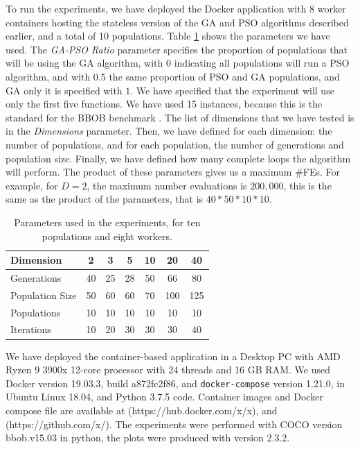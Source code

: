 \documentclass[runningheads]{llncs}
\begin{document}
To run the experiments, we have deployed the Docker application with 8 worker
containers hosting the stateless version of the GA and PSO algorithms described
earlier, and a total of 10 populations. Table \ref{tab:params:10} shows the
parameters we have used. The {\em GA-PSO Ratio} parameter specifies the proportion 
of populations that will be using the GA algorithm, with $0$ indicating all populations
will run a PSO algorithm, and with $0.5$ the same proportion of PSO and GA populations, 
and GA only it is specified with $1$. We have specified that the experiment
will use only the first five functions. We have used 15 instances, because 
this is the standard for the BBOB benchmark \cite{hansen2016coco}.
The list of dimensions that we have tested is in the {\em Dimensions} parameter. 
Then, we have defined for each dimension: the number of populations, and for each population,
the number of generations and population size. Finally, we have defined how many complete loops the
algorithm will perform. The product of these parameters gives us a maximum
\#FEs. For example, for $D = 2$, the maximum number evaluations is $200,000$,
this is the same as the product of the parameters, that is $40*50*10*10$. 

\begin{table}[h!tb]
  \small
  \caption{Parameters used in the experiments, for ten populations and eight workers.
  }
  \label{tab:params:10}
  \vspace{0.25cm}
  \centering
  \small
  \begin{tabular}{|l|c|c|c|c|c|c|}
    \hline
    Dimension        & 2  & 3  & 5  & 10 & 20  & 40  \\ \hline
    Generations      & 40 & 25 & 28 & 50 & 66  & 80  \\ \hline
    Population Size  & 50 & 60 & 60 & 70 & 100 & 125 \\ \hline
    Populations      & 10 & 10 & 10 & 10 & 10  & 10  \\ \hline
    Iterations       & 10 & 20 & 30 & 30 & 30  & 40  \\ \hline  
  \end{tabular}
\end{table}

We have deployed the container-based application in a
Desktop PC with AMD Ryzen 9 3900x 12-core processor with 24 threads 
and 16 GB RAM. We used Docker version 19.03.3, build a872fc2f86, and {\tt docker-compose} version 1.21.0, 
in Ubuntu Linux 18.04, and Python 3.7.5 code. Container images and Docker compose file are available at
(https://hub.docker.com/x/x), and (https://github.com/x/). 
The experiments were performed with COCO \cite{hansen2016coco} version bbob.v15.03 in python, 
the plots were produced with version 2.3.2.
\end{document}
